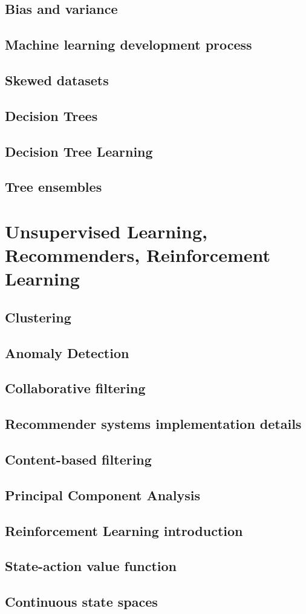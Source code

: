 \subsection{Bias and variance}
\subsection{Machine learning development process}
\subsection{Skewed datasets}
\subsection{Decision Trees}
\subsection{Decision Tree Learning}
\subsection{Tree ensembles}

\section{Unsupervised Learning, Recommenders, Reinforcement Learning}
\subsection{Clustering}
\subsection{Anomaly Detection}
\subsection{Collaborative filtering}
\subsection{Recommender systems implementation details}
\subsection{Content-based filtering}
\subsection{Principal Component Analysis}
\subsection{Reinforcement Learning introduction}
\subsection{State-action value function}
\subsection{Continuous state spaces}

